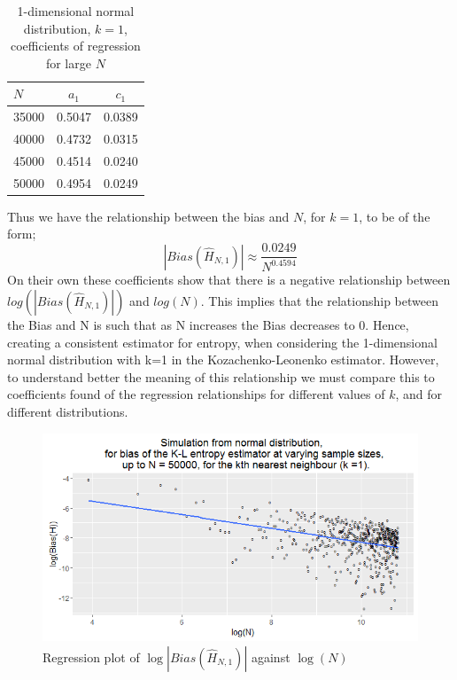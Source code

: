 \documentclass{article}
\begin{document}
\begin{table}
\caption{1-dimensional normal distribution, $k=1$, coefficients of regression for large $N$} \label{normal_k=1_reg_coeff_table}
\begin{center}
\begin{tabular}{| l | c c|}
\toprule
$N$ & $a_{1}$ & $c_{1}$ \\
\midrule[1pt]
35000 &  0.5047   &   0.0389   \\
40000 &  0.4732   &   0.0315  \\
45000 &  0.4514   &   0.0240  \\
50000 &  0.4954   &   0.0249   \\
\end{tabular}
\end{center}
\end{table}


Thus we have the relationship between the bias and $N$, for $k=1$, to be of the form;
\begin{equation}
|Bias(\hat{H}_{N, 1})| \approx \frac{0.0249}{N^{0.4594}} \nonumber
\end{equation}
On their own these coefficients show that there is a negative relationship between $log(|Bias(\hat{H}_{N, 1})|)$ and $log(N)$. This implies that the relationship between the Bias and N is such that as N increases the Bias decreases to 0. Hence, creating a consistent estimator for entropy, when considering the 1-dimensional normal distribution with k=1 in the Kozachenko-Leonenko estimator. However, to understand better the meaning of this relationship we must compare this to coefficients found of the regression relationships for different values of $k$, and for different distributions.

\begin{figure}
  \begin{center}
    \includegraphics[width=\textwidth]{./Graphs/Normal_k=1_plot.png}
  \end{center}
\caption{Regression plot of $\log|Bias(\hat{H}_{N, 1})|$ against $\log(N)$}
  \label{normal_k=1_graph}
\end{figure}
\end{document}
